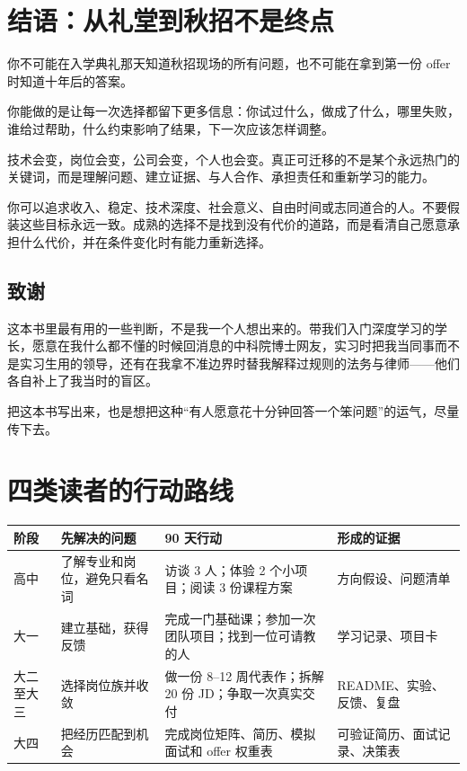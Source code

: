 \documentclass[UTF8,zihao=5,openany]{ctexbook}
\newif\ifbookappendix
\let\bookorigappendix\appendix
\renewcommand{\appendix}{\bookorigappendix\bookappendixtrue}
\begin{document}
\chapter{结语：从礼堂到秋招不是终点}
你不可能在入学典礼那天知道秋招现场的所有问题，也不可能在拿到第一份 offer 时知道十年后的答案。

你能做的是让每一次选择都留下更多信息：你试过什么，做成了什么，哪里失败，谁给过帮助，什么约束影响了结果，下一次应该怎样调整。

技术会变，岗位会变，公司会变，个人也会变。真正可迁移的不是某个永远热门的关键词，而是理解问题、建立证据、与人合作、承担责任和重新学习的能力。

你可以追求收入、稳定、技术深度、社会意义、自由时间或志同道合的人。不要假装这些目标永远一致。成熟的选择不是找到没有代价的道路，而是看清自己愿意承担什么代价，并在条件变化时有能力重新选择。

\section*{致谢}
这本书里最有用的一些判断，不是我一个人想出来的。带我们入门深度学习的学长，愿意在我什么都不懂的时候回消息的中科院博士网友，实习时把我当同事而不是实习生用的领导，还有在我拿不准边界时替我解释过规则的法务与律师——他们各自补上了我当时的盲区。

把这本书写出来，也是想把这种“有人愿意花十分钟回答一个笨问题”的运气，尽量传下去。

\appendix
\chapter{四类读者的行动路线}
\begin{longtable}{p{}p{}p{}p{}}
\toprule
阶段 & 先解决的问题 & 90 天行动 & 形成的证据 \\
\midrule
\endhead
高中 & 了解专业和岗位，避免只看名词 & 访谈 3 人；体验 2 个小项目；阅读 3 份课程方案 & 方向假设、问题清单 \\
大一 & 建立基础，获得反馈 & 完成一门基础课；参加一次团队项目；找到一位可请教的人 & 学习记录、项目卡 \\
大二至大三 & 选择岗位族并收敛 & 做一份 8--12 周代表作；拆解 20 份 JD；争取一次真实交付 & README、实验、反馈、复盘 \\
大四 & 把经历匹配到机会 & 完成岗位矩阵、简历、模拟面试和 offer 权重表 & 可验证简历、面试记录、决策表 \\
\bottomrule
\end{longtable}
\end{document}
